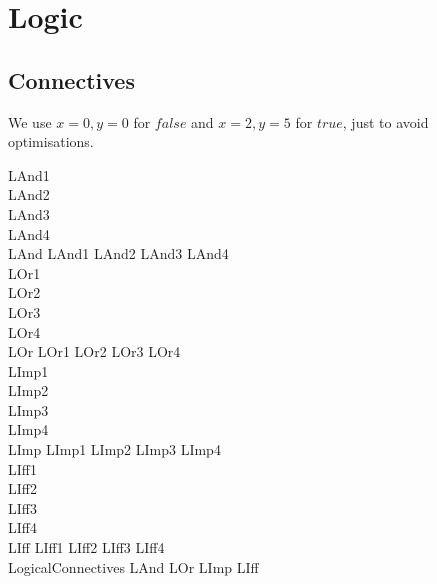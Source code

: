 \documentclass{article}
\begin{document}
\section{Logic}

\subsection{Connectives}
We use $x=0, y=0$ for $false$ and $x=2, y=5$ for $true$, just to avoid optimisations.
\begin{zed}
  LAnd1 \\
  LAnd2 \\
  LAnd3 \\
  LAnd4 \\
  LAnd  LAnd1 \land LAnd2 \land LAnd3 \land LAnd4\\
  \also
  LOr1 \\
  LOr2 \\
  LOr3 \\
  LOr4 \\
  LOr  LOr1 \land LOr2 \land LOr3 \land LOr4\\
  \also
  LImp1 \\
  LImp2 \\
  LImp3 \\
  LImp4 \\
  LImp  LImp1 \land LImp2 \land LImp3 \land LImp4\\
  \also
  LIff1 \\
  LIff2 \\
  LIff3 \\
  LIff4 \\
  LIff  LIff1 \land LIff2 \land LIff3 \land LIff4\\
  \also
  LogicalConnectives  LAnd \land LOr \land LImp \land LIff\\
\end{zed}
\end{document}
